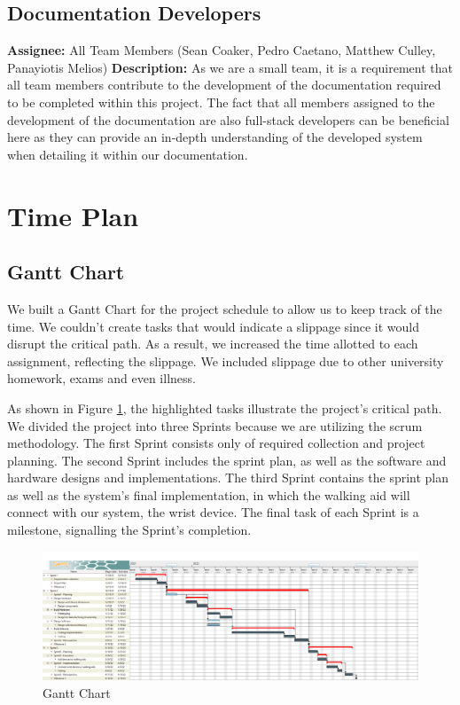         \subsection{Documentation Developers}
            \textbf{Assignee: } All Team Members (Sean Coaker, Pedro Caetano, Matthew Culley, Panayiotis Melios)\newline
            \textbf{Description: } As we are a small team, it is a requirement that all team members contribute to the development of the documentation required to be completed within this project. The fact that all members assigned to the development of the documentation are also full-stack developers can be beneficial here as they can provide an in-depth understanding of the developed system when detailing it within our documentation.

    \section{Time Plan}

        \subsection{Gantt Chart}
            We built a Gantt Chart for the project schedule to allow us to keep track of the time. We couldn't create tasks that
            would indicate a slippage since it would disrupt the critical path. As a result, we increased the time allotted to
            each assignment, reflecting the slippage. We included slippage due to other university homework, exams and even
            illness.

            As shown in Figure \ref{fig:gantt_chart}, the highlighted tasks illustrate the project's critical path. We divided
            the project into three Sprints because we are utilizing the scrum methodology. The first Sprint consists only of
            required collection and project planning. The second Sprint includes the sprint plan, as well as the software and
            hardware designs and implementations. The third Sprint contains the sprint plan as well as the system's final
            implementation, in which the walking aid will connect with our system, the wrist device. The final task of each
            Sprint is a milestone, signalling the Sprint's completion.

            \begin{figure}[H]
              \includegraphics[width=\linewidth]{graphics/Gantt_Chart.png}
              \caption{Gantt Chart}
              \label{fig:gantt_chart}
            \end{figure}

